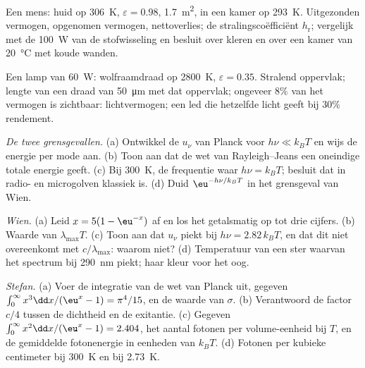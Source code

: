 \begin{exercise}[$\star$]\label{exo:b2:thermal-radiation:3}
Een mens: huid op \qty{306}{K}, $\varepsilon = 0.98$, \qty{1.7}{m^2}, in een
kamer op \qty{293}{K}. Uitgezonden vermogen, opgenomen vermogen, nettoverlies; de
stralingscoëfficiënt $h_{\text{r}}$; vergelijk met de \qty{100}{W} van de
stofwisseling en besluit over kleren en over een kamer van \qty{20}{\celsius}
met koude wanden.
\end{exercise}

\begin{exercise}[$\star$]\label{exo:b2:thermal-radiation:4}
Een lamp van \qty{60}{W}: wolfraamdraad op \qty{2800}{K}, $\varepsilon = 0.35$.
Stralend oppervlak; lengte van een draad van \qty{50}{\micro m} met dat oppervlak;
ongeveer $8\%$ van het vermogen is zichtbaar: lichtvermogen; een led die
hetzelfde licht geeft bij $30\%$ rendement.
\end{exercise}

\begin{exercise}[$\star\star$]\label{exo:b2:thermal-radiation:5}
\emph{De twee grensgevallen.} (a) Ontwikkel de $u_\nu$ van Planck voor
$h\nu \ll k_BT$ en
wijs de energie per mode aan. (b) Toon aan dat de wet van Rayleigh--Jeans
een oneindige totale energie geeft. (c) Bij \qty{300}{K}, de frequentie waar
$h\nu = k_BT$; besluit dat  in radio- en microgolven
klassiek is. (d) Duid $\eu^{-h\nu/k_BT}$ in het grensgeval van Wien.
\end{exercise}

\begin{exercise}[$\star\star$]\label{exo:b2:thermal-radiation:6}
\emph{Wien.} (a) Leid $x = 5(1 - \eu^{-x})$ af en los het getalsmatig
op tot drie cijfers. (b) Waarde van $\lambda_{\max}T$. (c) Toon aan dat $u_\nu$
piekt bij $h\nu = 2.82\,k_BT$, en dat dit niet overeenkomt met
$c/\lambda_{\max}$: waarom niet? (d) Temperatuur van een ster waarvan het spectrum
bij \qty{290}{nm} piekt; haar kleur voor het oog.
\end{exercise}

\begin{exercise}[$\star\star$]\label{exo:b2:thermal-radiation:7}
\emph{Stefan.} (a) Voer de integratie van de wet van Planck uit, gegeven
$\int_0^\infty x^3\dd x/(\eu^x - 1) = \pi^4/15$, en de waarde van $\sigma$.
(b) Verantwoord de factor $c/4$ tussen de dichtheid en de exitantie. (c)
Gegeven $\int_0^\infty x^2\dd x/(\eu^x - 1) = 2.404$, het aantal fotonen
per volume-eenheid bij $T$, en de gemiddelde fotonenergie in eenheden van $k_BT$.
(d) Fotonen per kubieke centimeter bij \qty{300}{K} en bij \qty{2.73}{K}.
\end{exercise}

